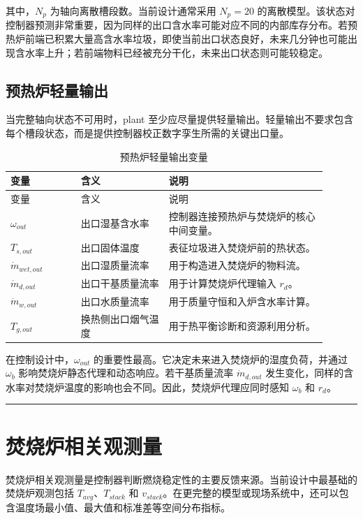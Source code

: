 \documentclass[UTF8,openany,zihao=-4,oneside]{ctexbook}
\newcommand{\manualdivider}{\par\vspace{0.6em}\noindent\textcolor{FGLine}{\rule{\linewidth}{0.7pt}}\vspace{0.6em}\par}
\begin{document}
其中，\(N_p\) 为轴向离散槽段数。当前设计通常采用 \(N_p=20\) 的离散模型。该状态对控制器预测非常重要，因为同样的出口含水率可能对应不同的内部库存分布。若预热炉前端已积累大量高含水率垃圾，即使当前出口状态良好，未来几分钟也可能出现含水率上升；若前端物料已经被充分干化，未来出口状态则可能较稳定。

\subsection{预热炉轻量输出}\label{subsec:preheater-output}

当完整轴向状态不可用时，plant 至少应尽量提供轻量输出。轻量输出不要求包含每个槽段状态，而是提供控制器校正数字孪生所需的关键出口量。

\begin{longtable}{@{}p{0.20\linewidth}p{0.25\linewidth}p{0.45\linewidth}@{}}
\caption{预热炉轻量输出变量}\label{tab:preheater-output-vars}\\
\toprule
变量 & 含义 & 说明 \\
\midrule
\endfirsthead
\toprule
变量 & 含义 & 说明 \\
\midrule
\endhead
\(\omega_{out}\) & 出口湿基含水率 & 控制器连接预热炉与焚烧炉的核心中间变量。 \\
\(T_{s,out}\) & 出口固体温度 & 表征垃圾进入焚烧炉前的热状态。 \\
\(\dot m_{wet,out}\) & 出口湿质量流率 & 用于构造进入焚烧炉的物料流。 \\
\(\dot m_{d,out}\) & 出口干基质量流率 & 用于计算焚烧炉代理输入 \(r_d\)。 \\
\(\dot m_{w,out}\) & 出口水质量流率 & 用于质量守恒和入炉含水率计算。 \\
\(T_{g,out}\) & 换热侧出口烟气温度 & 用于热平衡诊断和资源利用分析。 \\
\bottomrule
\end{longtable}

在控制设计中，\(\omega_{out}\) 的重要性最高。它决定未来进入焚烧炉的湿度负荷，并通过 \(\omega_b\) 影响焚烧炉静态代理和动态响应。若干基质量流率 \(\dot m_{d,out}\) 发生变化，同样的含水率对焚烧炉温度的影响也会不同。因此，焚烧炉代理应同时感知 \(\omega_b\) 和 \(r_d\)。

\manualdivider

\section{焚烧炉相关观测量}\label{sec:furnace-observations}

焚烧炉相关观测量是控制器判断燃烧稳定性的主要反馈来源。当前设计中最基础的焚烧炉观测包括 \(T_{avg}\)、\(T_{stack}\) 和 \(v_{stack}\)。在更完整的模型或现场系统中，还可以包含温度场最小值、最大值和标准差等空间分布指标。
\end{document}
